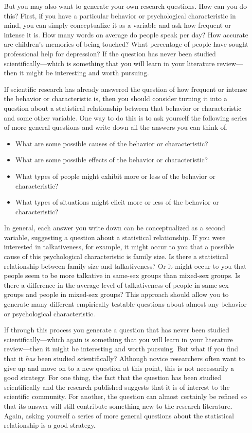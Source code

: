 \documentclass[
]{krantz}
\providecommand{\tightlist}{%
  \setlength{\itemsep}{0pt}\setlength{\parskip}{0pt}}
\begin{document}
But you may also want to generate your own research questions. How can you do this? First, if you have a particular behavior or psychological characteristic in mind, you can simply conceptualize it as a variable and ask how frequent or intense it is. How many words on average do people speak per day? How accurate are children's memories of being touched? What percentage of people have sought professional help for depression? If the question has never been studied scientifically---which is something that you will learn in your literature review---then it might be interesting and worth pursuing.

If scientific research has already answered the question of how frequent or intense the behavior or characteristic is, then you should consider turning it into a question about a statistical relationship between that behavior or characteristic and some other variable. One way to do this is to ask yourself the following series of more general questions and write down all the answers you can think of.

\begin{itemize}
\tightlist
\item
  What are some possible causes of the behavior or characteristic?
\item
  What are some possible effects of the behavior or characteristic?
\item
  What types of people might exhibit more or less of the behavior or characteristic?
\item
  What types of situations might elicit more or less of the behavior or characteristic?
\end{itemize}

In general, each answer you write down can be conceptualized as a second variable, suggesting a question about a statistical relationship. If you were interested in talkativeness, for example, it might occur to you that a possible cause of this psychological characteristic is family size. Is there a statistical relationship between family size and talkativeness? Or it might occur to you that people seem to be more talkative in same-sex groups than mixed-sex groups. Is there a difference in the average level of talkativeness of people in same-sex groups and people in mixed-sex groups? This approach should allow you to generate many different empirically testable questions about almost any behavior or psychological characteristic.

If through this process you generate a question that has never been studied scientifically---which again is something that you will learn in your literature review---then it might be interesting and worth pursuing. But what if you find that it \emph{has} been studied scientifically? Although novice researchers often want to give up and move on to a new question at this point, this is not necessarily a good strategy. For one thing, the fact that the question has been studied scientifically and the research published suggests that it is of interest to the scientific community. For another, the question can almost certainly be refined so that its answer will still contribute something new to the research literature. Again, asking yourself a series of more general questions about the statistical relationship is a good strategy.
\end{document}
